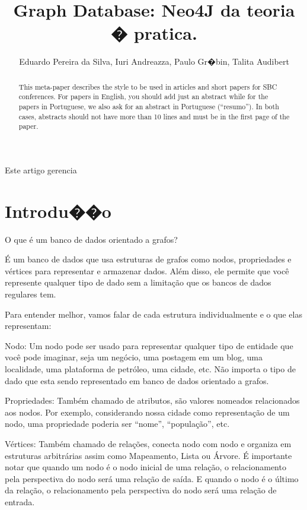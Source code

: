 \documentclass[12pt]{article}
\title{Graph Database: Neo4J da teoria � pratica. }
\author{Eduardo Pereira da Silva\inst{1}, Iuri Andreazza\inst{1}, Paulo Gr�bin\inst{1}, Talita Audibert\inst{1} }
\begin{document}
 

\maketitle

\begin{abstract}
  This meta-paper describes the style to be used in articles and short papers
  for SBC conferences. For papers in English, you should add just an abstract
  while for the papers in Portuguese, we also ask for an abstract in
  Portuguese (``resumo''). In both cases, abstracts should not have more than
  10 lines and must be in the first page of the paper.
\end{abstract}
     
\begin{resumo} 
	Este artigo gerencia 
\end{resumo}


\section{Introdu��o}\label{sec:intro}


O que é um banco de dados orientado a grafos?

É um banco de dados que usa estruturas de grafos como nodos, propriedades e vértices para representar e armazenar dados. Além disso, ele permite que você represente qualquer tipo de dado sem a limitação que os bancos de dados regulares tem.

Para entender melhor, vamos falar de cada estrutura individualmente e o que elas representam:

Nodo: Um nodo pode ser usado para representar qualquer tipo de entidade que você pode imaginar, seja um negócio, uma postagem em um blog, uma localidade, uma plataforma de petróleo, uma cidade, etc. Não importa o tipo de dado que esta sendo representado em banco de dados orientado a grafos.

Propriedades: Também chamado de atributos, são valores nomeados relacionados aos nodos. Por exemplo, considerando nossa cidade como representação de um nodo, uma propriedade poderia ser “nome”, “população”, etc.

Vértices: Também chamado de relações, conecta nodo com nodo e organiza em estruturas arbitrárias assim como Mapeamento, Lista ou Árvore. É importante notar que quando um nodo é o nodo inicial de uma relação, o relacionamento pela perspectiva do nodo será uma relação de saída. E quando o nodo é o último da relação, o relacionamento pela perspectiva do nodo será uma relação de entrada.
\end{document}

